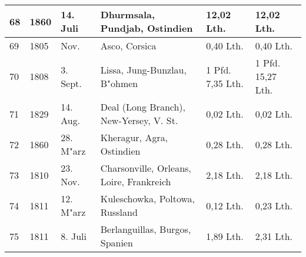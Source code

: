 \documentclass[a4paper, 11pt, oneside, german]{article}
\begin{document}
\begin{center}
\begin{footnotesize}
\begin{tabular}{ |p{7mm}|p{7mm}|p{13mm}|p{48mm}|p{22mm}|p{22mm}| }
    68 & 1860 & 14. Juli & Dhurmsala, Pundjab, Ostindien & 12,02 Lth. & 12,02 Lth.\\\hline
    69 & 1805 & Nov. & Asco, Corsica & 0,40 Lth. & 0,40 Lth.\\\hline
    70 & 1808 & 3. Sept. & Lissa, Jung-Bunzlau, B"ohmen & 1 Pfd. 7,35 Lth. & 1 Pfd. 15,27 Lth.\\\hline
    71 & 1829 & 14. Aug. & Deal (Long Branch), New-Yersey, V. St. & 0,02 Lth. & 0,02 Lth.\\\hline
    72 & 1860 & 28. M"arz & Kheragur, Agra, Ostindien & 0,28 Lth. & 0,28 Lth.\\\hline
    73 & 1810 & 23. Nov. & Charsonville, Orleans, Loire, Frankreich & 2,18 Lth. & 2,18 Lth.\\\hline
    74 & 1811 & 12. M"arz & Kuleschowka, Poltowa, Russland & 0,12 Lth. & 0,23 Lth.\\\hline
    75 & 1811 & 8. Juli & Berlanguillas, Burgos, Spanien & 1,89 Lth. & 2,31 Lth.\\
    \hline
\end{tabular}
\end{footnotesize}
\end{center}
\end{document}

